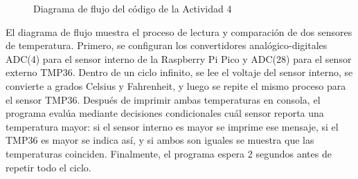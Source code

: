 \documentclass[letterpaper,12pt]{article}
\begin{document}
\begin{figure}[htbp]
        \caption{Diagrama de flujo del código de la Actividad 4}
    \end{figure}

    El diagrama de flujo muestra el proceso de lectura y comparación de dos sensores de temperatura. Primero, se configuran los convertidores analógico-digitales ADC(4) para el sensor interno de la Raspberry Pi Pico y ADC(28) para el sensor externo TMP36. Dentro de un ciclo infinito, se lee el voltaje del sensor interno, se convierte a grados Celsius y Fahrenheit, y luego se repite el mismo proceso para el sensor TMP36. Después de imprimir ambas temperaturas en consola, el programa evalúa mediante decisiones condicionales cuál sensor reporta una temperatura mayor: si el sensor interno es mayor se imprime ese mensaje, si el TMP36 es mayor se indica así, y si ambos son iguales se muestra que las temperaturas coinciden. Finalmente, el programa espera 2 segundos antes de repetir todo el ciclo.
\end{document}

